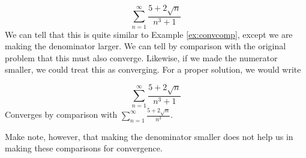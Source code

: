 \begin{ex}
  \[ \sum_{n=1}^{\infty} \frac{5+2\sqrt{n}}{n^3+1} \]
  We can tell that this is quite similar to Example \ref{ex:convcomp}, except we are making the denominator larger.
  We can tell by comparison with the original problem that this must also converge. Likewise, if we made the numerator smaller, we could treat this as converging.
  For a proper solution, we would write
  \begin{sol}
    \[ \sum_{n=1}^{\infty} \frac{5+2\sqrt{n}}{n^3+1} \]
    Converges by comparison with \( \sum_{n=1}^{\infty} \frac{5+2\sqrt n}{n^3} \).
  \end{sol}
  \begin{figure}[H]
    \begin{center}
    \end{center}
  \end{figure}

  Make note, however, that making the denominator smaller does not help us in making these comparisons for convergence.
\end{ex}
